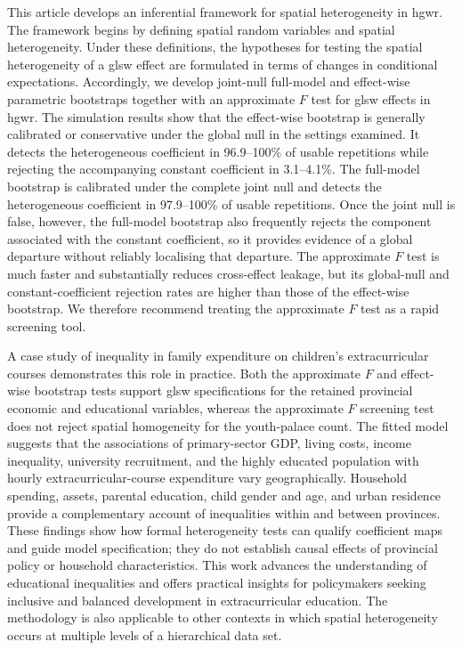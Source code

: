 \documentclass[times]{interact}
\theoremstyle{plain}%
\theoremstyle{definition}
\theoremstyle{remark}
\begin{document}
This article develops an inferential framework for spatial heterogeneity in \gls{hgwr}.
The framework begins by defining spatial random variables and spatial heterogeneity.
Under these definitions, the hypotheses for testing the spatial heterogeneity of a \gls{glsw} effect are formulated in terms of changes in conditional expectations.
Accordingly, we develop joint-null full-model and effect-wise parametric bootstraps together with an approximate $F$ test for \gls{glsw} effects in \gls{hgwr}.
The simulation results show that the effect-wise bootstrap is generally calibrated or conservative under the global null in the settings examined.
It detects the heterogeneous coefficient in 96.9--100\% of usable repetitions while rejecting the accompanying constant coefficient in 3.1--4.1\%.
The full-model bootstrap is calibrated under the complete joint null and detects the heterogeneous coefficient in 97.9--100\% of usable repetitions.
Once the joint null is false, however, the full-model bootstrap also frequently rejects the component associated with the constant coefficient, so it provides evidence of a global departure without reliably localising that departure.
The approximate $F$ test is much faster and substantially reduces cross-effect leakage, but its global-null and constant-coefficient rejection rates are higher than those of the effect-wise bootstrap.
We therefore recommend treating the approximate $F$ test as a rapid screening tool.

A case study of inequality in family expenditure on children's extracurricular courses demonstrates this role in practice.
Both the approximate $F$ and effect-wise bootstrap tests support \gls{glsw} specifications for the retained provincial economic and educational variables, whereas the approximate $F$ screening test does not reject spatial homogeneity for the youth-palace count.
The fitted model suggests that the associations of primary-sector GDP, living costs, income inequality, university recruitment, and the highly educated population with hourly extracurricular-course expenditure vary geographically.
Household spending, assets, parental education, child gender and age, and urban residence provide a complementary account of inequalities within and between provinces.
These findings show how formal heterogeneity tests can qualify coefficient maps and guide model specification; they do not establish causal effects of provincial policy or household characteristics.
This work advances the understanding of educational inequalities and offers practical insights for policymakers seeking inclusive and balanced development in extracurricular education.
The methodology is also applicable to other contexts in which spatial heterogeneity occurs at multiple levels of a hierarchical data set.
\end{document}
